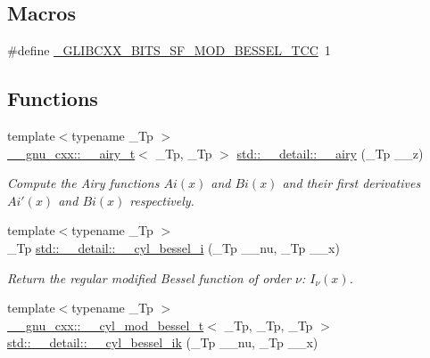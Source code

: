 \subsection*{Macros}
\begin{DoxyCompactItemize}
\item 
\#define \hyperlink{sf__mod__bessel_8tcc_a746f247a80ce9ef275dfb1cffbabeabd}{\+\_\+\+G\+L\+I\+B\+C\+X\+X\+\_\+\+B\+I\+T\+S\+\_\+\+S\+F\+\_\+\+M\+O\+D\+\_\+\+B\+E\+S\+S\+E\+L\+\_\+\+T\+CC}~1
\end{DoxyCompactItemize}
\subsection*{Functions}
\begin{DoxyCompactItemize}
\item 
{\footnotesize template$<$typename \+\_\+\+Tp $>$ }\\\hyperlink{struct____gnu__cxx_1_1____airy__t}{\+\_\+\+\_\+gnu\+\_\+cxx\+::\+\_\+\+\_\+airy\+\_\+t}$<$ \+\_\+\+Tp, \+\_\+\+Tp $>$ \hyperlink{namespacestd_1_1____detail_ab88aba2ff9e70425c477043a9fa6a0dc}{std\+::\+\_\+\+\_\+detail\+::\+\_\+\+\_\+airy} (\+\_\+\+Tp \+\_\+\+\_\+z)
\begin{DoxyCompactList}\small\item\em Compute the Airy functions $ Ai(x) $ and $ Bi(x) $ and their first derivatives $ Ai'(x) $ and $ Bi(x) $ respectively. \end{DoxyCompactList}\item 
{\footnotesize template$<$typename \+\_\+\+Tp $>$ }\\\+\_\+\+Tp \hyperlink{namespacestd_1_1____detail_a72e3392d5c03c0bc8f2b5ffb8c1304b5}{std\+::\+\_\+\+\_\+detail\+::\+\_\+\+\_\+cyl\+\_\+bessel\+\_\+i} (\+\_\+\+Tp \+\_\+\+\_\+nu, \+\_\+\+Tp \+\_\+\+\_\+x)
\begin{DoxyCompactList}\small\item\em Return the regular modified Bessel function of order $ \nu $\+: $ I_{\nu}(x) $. \end{DoxyCompactList}\item 
{\footnotesize template$<$typename \+\_\+\+Tp $>$ }\\\hyperlink{struct____gnu__cxx_1_1____cyl__mod__bessel__t}{\+\_\+\+\_\+gnu\+\_\+cxx\+::\+\_\+\+\_\+cyl\+\_\+mod\+\_\+bessel\+\_\+t}$<$ \+\_\+\+Tp, \+\_\+\+Tp, \+\_\+\+Tp $>$ \hyperlink{namespacestd_1_1____detail_a9ada6640e605fc21b12191e651e39de1}{std\+::\+\_\+\+\_\+detail\+::\+\_\+\+\_\+cyl\+\_\+bessel\+\_\+ik} (\+\_\+\+Tp \+\_\+\+\_\+nu, \+\_\+\+Tp \+\_\+\+\_\+x)

\end{DoxyCompactItemize}
